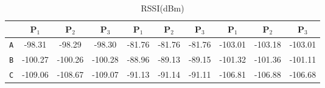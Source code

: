 \begin{table}[H]
\begin{subtable}{\textwidth}
\begin{center}
\begin{tabular}{|c|c|c|c|c|c|c|c|c|c|}
                                   & \textbf{P$_1$}                        & \textbf{P$_2$}                          & \textbf{P$_3$}                         & \textbf{P$_1$} & \textbf{P$_2$} & \textbf{P$_3$} & \textbf{P$_1$} & \textbf{P$_2$} & \textbf{P$_3$} \\ \hline
                        \texttt{A} & -98.31                                & -98.29                                  & -98.30                                 & -81.76         & -81.76         & -81.76         & -103.01        & -103.18        & -103.01        \\ \hline
                        \texttt{B} & -100.27                               & -100.26                                 & -100.28                                & -88.96         & -89.13         & -89.15         & -101.32        & -101.36        & -101.11        \\ \hline
                        \texttt{C} & -109.06                               & -108.67                                 & -109.07                                & -91.13         & -91.14         & -91.11         & -106.81        & -106.88        & -106.68        \\ \hline
                  \end{tabular}
                  \caption{RSSI(dBm)}
                  \label{table:rssi2}
            \end{center}
      \end{subtable}%
      \label{tab:table1}
\end{table}

